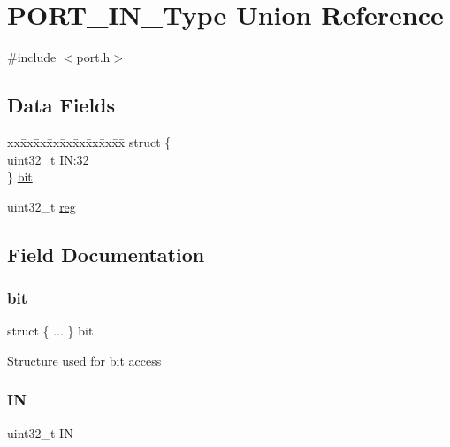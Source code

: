 \hypertarget{union_p_o_r_t___i_n___type}{}\section{P\+O\+R\+T\+\_\+\+I\+N\+\_\+\+Type Union Reference}
\label{union_p_o_r_t___i_n___type}


{\ttfamily \#include $<$port.\+h$>$}

\subsection*{Data Fields}
\begin{DoxyCompactItemize}
\item 
\begin{tabbing}
xx\=xx\=xx\=xx\=xx\=xx\=xx\=xx\=xx\=\kill
struct \{\\
\>uint32\_t \mbox{\hyperlink{union_p_o_r_t___i_n___type_ae2b56ada7f2a2b46fe10076aab7e8f5e}{IN}}:32\\
\} \mbox{\hyperlink{union_p_o_r_t___i_n___type_a23e15c4b4a47d5d1bf63c37aae96cfcb}{bit}}\\

\end{tabbing}\item 
uint32\+\_\+t \mbox{\hyperlink{union_p_o_r_t___i_n___type_a6b91636401516a477989a336376d7b40}{reg}}
\end{DoxyCompactItemize}


\subsection{Field Documentation}
\mbox{\label{union_p_o_r_t___i_n___type_a23e15c4b4a47d5d1bf63c37aae96cfcb}} 
\subsubsection{\texorpdfstring{bit}{bit}}
{\footnotesize\ttfamily struct \{ ... \}   bit}

Structure used for bit access \mbox{\label{union_p_o_r_t___i_n___type_ae2b56ada7f2a2b46fe10076aab7e8f5e}} 
\subsubsection{\texorpdfstring{IN}{IN}}
{\footnotesize\ttfamily uint32\+\_\+t IN}

